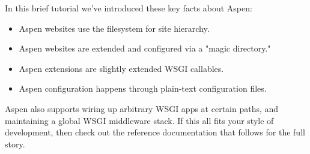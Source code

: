 In this brief tutorial we've introduced these key facts about Aspen:

\begin{itemize}
\item{Aspen websites use the filesystem for site hierarchy.}
\item{Aspen websites are extended and configured via a "magic directory."}
\item{Aspen extensions are slightly extended WSGI callables.}
\item{Aspen configuration happens through plain-text configuration files.}
\end{itemize}

Aspen also supports wiring up arbitrary WSGI apps at certain paths, and
maintaining a global WSGI middleware stack. If this all fits your style of
development, then check out the reference documentation that follows for the
full story.
